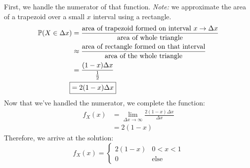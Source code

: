 \documentclass[titlepage, 12pt, leqno]{article}
\begin{document}
\begin{ex}
\[    \]
    First, we handle the numerator of that function. \textit{Note:} we approximate
    the area of a trapezoid over a small $x$ interval using a rectangle.
    \begin{align*}
        \mathbb{P}(X \in  \Delta x) &= \frac{ \text{area of 
        trapezoid formed on interval $x \to \Delta x$}}{ \text{area of whole
        triangle}} \\
                                    &\approx \frac{ \text{area of rectangle
                                    formed on that interval}}{ \text{area of the
                                    whole triangle}} \\
                                    &= \frac{(1-x)\Delta x}{\frac{1}{2}} \\
                \Aboxed{&= 2(1-x)\Delta x} 
    \end{align*}
    Now that we've handled the numerator, we complete the function:
    \begin{align*}
        f_X(x) &= \lim_{\Delta x \to \infty} \frac{2(1-x)\Delta x}{\Delta x} \\
               &= 2(1-x)
    \end{align*}
    Therefore, we arrive at the solution:
    \[
        \boxed{f_X(x) = 
        \begin{cases}
            2(1-x) & 0<x<1 \\
            0 & \text{else}
        \end{cases}
        } 
    \]
\end{ex}
\end{document}

